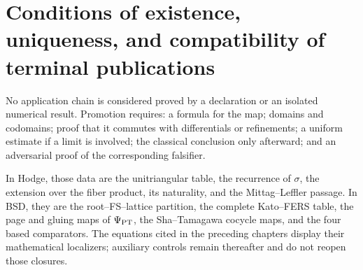 \section{Conditions of existence, uniqueness, and compatibility of terminal publications}

No application chain is considered proved by a declaration or an isolated numerical result. Promotion requires: a formula for the map; domains and codomains; proof that it commutes with differentials or refinements; a uniform estimate if a limit is involved; the classical conclusion only afterward; and an adversarial proof of the corresponding falsifier.

In Hodge, those data are the unitriangular table, the recurrence of $\sigma$, the
extension over the fiber product, its naturality, and the
Mittag--Leffler passage. In BSD, they are the root--FS--lattice partition, the complete
Kato--FERS table, the page and gluing maps of $\Psi_{\rm PT}$, the
Sha--Tamagawa cocycle maps, and the four based comparators. The equations cited in the preceding chapters display their mathematical localizers; auxiliary controls remain thereafter and do not reopen those closures.
